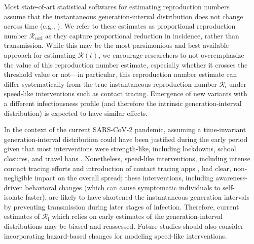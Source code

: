 \documentclass[12pt]{article}
\newcommand{\Rx}[1]{\ensuremath{{\mathcal R}_{#1}}\xspace}
\newcommand{\Ri}{\Rx{\mathrm{i}}}
\newcommand{\Rcori}{\Rx{\mathrm{cori}}}
\begin{document}
Most state-of-art statistical softwares for estimating reproduction numbers assume that the instantaneous generation-interval distribution does not change across time (e.g., \citep{10.12688/wellcomeopenres.16006.2,flaxman2020estimating,brauner2021inferring}).
We refer to these estimates as proportional reproduction number $\Rcori$ as they capture proportional reduction in incidence, rather than transmission.
While this may be the most parsimonious and best available approach for estimating $\mathcal R(t)$, we encourage researchers to not overemphasize the value of this reproduction number estimate, especially whether it crosses the threshold value or not---in particular, this reproduction number estimate can differ systematically from the true instantaneous reproduction number $\Ri$ under speed-like interventions such as contact tracing.
Emergence of new variants with a different infectiousness profile (and therefore the intrinsic generation-interval distribution) is expected to have similar effects.

In the context of the current SARS-CoV-2 pandemic, assuming a time-invariant generation-interval distribution could have been justified during the early period given that most interventions were strength-like, including lockdowns, school closures, and travel bans \citep{flaxman2020estimating,li2021temporal,brauner2021inferring}.
Nonetheless, speed-like  interventions, including intense contact tracing efforts \citep{park2020contact} and introduction of contact tracing apps \citep{wymant2021introduction}, had clear, non-negligible impact on the overall spread;
these interventions, including awareness-driven behavioral changes (which can cause symptomatic individuals to self-isolate faster), are likely to have shortened the instantaneous generation intervals by preventing transmission during later stages of infection.
Therefore, current estimates of $\Ri$ which relies on early estimates of the generation-interval distributions may be biased and reassessed.
Future studies should also consider incorporating hazard-based changes for modeling speed-like interventions.
\end{document}
